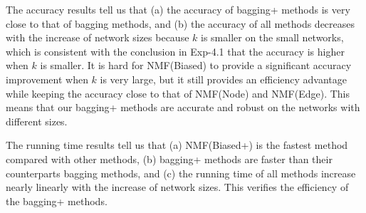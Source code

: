 \documentclass[10pt,journal,compsoc]{IEEEtran}
\newcommand{\Node}{{\sf NMF(Node)}\xspace}
\newcommand{\Edge}{{\sf NMF(Edge)}\xspace}
\newcommand{\Biased}{{\sf NMF(Biased)}\xspace}
\newcommand{\Biasedp}{{\sf NMF(Biased+)}\xspace}
\begin{document}
The accuracy results tell us that (a) the accuracy of bagging+ methods is very close to
that of bagging methods, and (b) the accuracy of all methods decreases with the
increase of network sizes because $k$ is smaller on the small networks, which is consistent
with the conclusion in Exp-4.1 that the accuracy is higher when $k$ is smaller. It is hard
for \Biased to provide a significant accuracy improvement when $k$ is very large, but it still provides
an efficiency advantage while keeping the accuracy close to that of \Node and \Edge.
This means that our bagging+ methods are accurate and robust on the networks with different sizes.

The running time results tell us that (a) \Biasedp is the fastest method compared
with other methods, (b) bagging+ methods are faster than their counterparts bagging
methods, and (c) the running time of all methods increase nearly linearly with the
increase of network sizes. This verifies the efficiency of the bagging+ methods.
\end{document}
